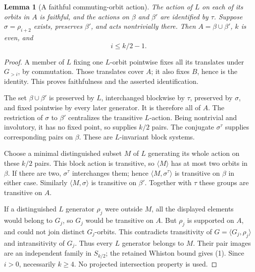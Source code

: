 \documentclass[11pt,a4paper]{article}
\newtheorem{lemma}{Lemma}
\newcommand{\gen}[1]{\langle#1\rangle}
\begin{document}
\begin{lemma}[A faithful commuting-orbit action]
The action of $L$ on each of its orbits in $A$ is faithful,
and the actions on $\beta$ and $\beta'$ are identified by
$\tau$. Suppose $\sigma=\rho_{i+2}$ exists, preserves
$\beta'$, and acts nontrivially there. Then $A=\beta\cup\beta'$,
$k$ is even, and
\[
                              i\leq k/2-1.               \tag{1}
\]
\end{lemma}
\begin{proof}
A member of $L$ fixing one $L$-orbit pointwise fixes all its
translates under $G_{>i}$, by commutation. Those translates
cover $A$; it also fixes $B$, hence is the identity. This
proves faithfulness and the asserted identification.

The set $\beta\cup\beta'$ is preserved by $L$, interchanged
blockwise by $\tau$, preserved by $\sigma$, and fixed
pointwise by every later generator. It is therefore all of
$A$. The restriction of $\sigma$ to $\beta'$ centralizes
the transitive $L$-action. Being nontrivial and involutory,
it has no fixed point, so supplies $k/2$ pairs. The conjugate
$\sigma^\tau$ supplies corresponding pairs on $\beta$.
These are $L$-invariant block systems.

Choose a minimal distinguished subset $M$ of $L$ generating
its whole action on these $k/2$ pairs. This block action is
transitive, so $\gen M$ has at most two orbits in $\beta$.
If there are two, $\sigma^\tau$ interchanges them; hence
$\gen{M,\sigma^\tau}$ is transitive on $\beta$ in either
case. Similarly $\gen{M,\sigma}$ is transitive on $\beta'$.
Together with $\tau$ these groups are transitive on $A$.

If a distinguished $L$ generator $\rho_j$ were outside $M$,
all the displayed elements would belong to $G_j$, so $G_j$
would be transitive on $A$. But $\rho_j$ is supported on $A$,
and could not join distinct $G_j$-orbits. This contradicts
transitivity of $G=\gen{G_j,\rho_j}$ and intransitivity of
$G_j$. Thus every $L$ generator belongs to $M$. Their pair
images are an independent family in $S_{k/2}$; the retained
Whiston bound gives (1). Since $i>0$, necessarily $k\geq4$.
No projected intersection property is used.
\end{proof}
\end{document}
